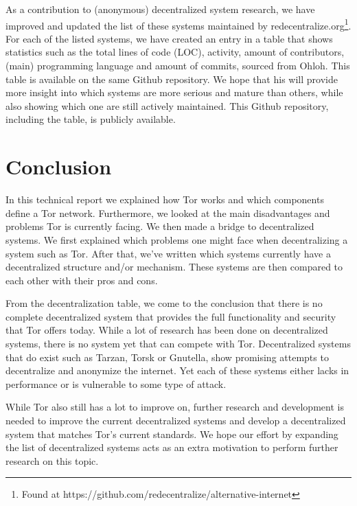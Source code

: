 \documentclass{article}
\begin{document}
	As a contribution to (anonymous) decentralized system research, we have improved and updated the list of these systems maintained by redecentralize.org\footnote{Found at https://github.com/redecentralize/alternative-internet}. For each of the listed systems, we have created an entry in a table that shows statistics such as the total lines of code (LOC), activity, amount of contributors, (main) programming language and amount of commits, sourced from Ohloh. This table is available on the same Github repository. We hope that his will provide more insight into which systems are more serious and mature than others, while also showing which one are still actively maintained. This Github repository, including the table, is publicly available.

	\begin{landscape}
		\begin{table}[p]
			
		\end{table}
	\end{landscape}

\section{Conclusion}
	\label{sec:conclusion}
		
	In this technical report we explained how Tor works and which components define a Tor network. Furthermore, we looked at the main disadvantages and problems Tor is currently facing. We then made a bridge to decentralized systems. We first explained which problems one might face when decentralizing a system such as Tor. After that, we've written which systems currently have a decentralized structure and/or mechanism. These systems are then compared to each other with their pros and cons.
		
	From the decentralization table, we come to the conclusion that there is no complete decentralized system that provides the full functionality and security that Tor offers today. While a lot of research has been done on decentralized systems, there is no system yet that can compete with Tor. Decentralized systems that do exist such as Tarzan, Torsk or Gnutella, show promising attempts to decentralize and anonymize the internet. Yet each of these systems either lacks in performance or is vulnerable to some type of attack.
		
	While Tor also still has a lot to improve on, further research and development is needed to improve the current decentralized systems and develop a decentralized system that matches Tor's current standards. We hope our effort by expanding the list of decentralized systems acts as an extra motivation to perform further research on this topic.



\end{document}
